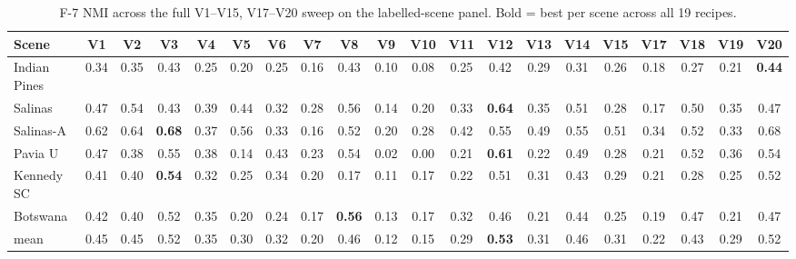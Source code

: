 \documentclass[journal,a4paper,10pt]{IEEEtran}
\begin{document}
\begin{table}[ht]
\caption{F-7 NMI across the full V1--V15, V17--V20 sweep on the
labelled-scene panel. Bold = best per scene across all 19 recipes.}
\label{tab:f7-full19}
\centering
\scriptsize
\setlength{\tabcolsep}{3pt}
\begin{tabular}{l*{19}{c}}
\toprule
Scene & V1 & V2 & V3 & V4 & V5 & V6 & V7 & V8 & V9 & V10 & V11 & V12 & V13 & V14 & V15 & V17 & V18 & V19 & V20 \\
\midrule
Indian Pines & 0.34 & 0.35 & 0.43 & 0.25 & 0.20 & 0.25 & 0.16 & 0.43 & 0.10 & 0.08 & 0.25 & 0.42 & 0.29 & 0.31 & 0.26 & 0.18 & 0.27 & 0.21 & \textbf{0.44} \\
Salinas      & 0.47 & 0.54 & 0.43 & 0.39 & 0.44 & 0.32 & 0.28 & 0.56 & 0.14 & 0.20 & 0.33 & \textbf{0.64} & 0.35 & 0.51 & 0.28 & 0.17 & 0.50 & 0.35 & 0.47 \\
Salinas-A    & 0.62 & 0.64 & \textbf{0.68} & 0.37 & 0.56 & 0.33 & 0.16 & 0.52 & 0.20 & 0.28 & 0.42 & 0.55 & 0.49 & 0.55 & 0.51 & 0.34 & 0.52 & 0.33 & 0.68 \\
Pavia U      & 0.47 & 0.38 & 0.55 & 0.38 & 0.14 & 0.43 & 0.23 & 0.54 & 0.02 & 0.00 & 0.21 & \textbf{0.61} & 0.22 & 0.49 & 0.28 & 0.21 & 0.52 & 0.36 & 0.54 \\
Kennedy SC   & 0.41 & 0.40 & \textbf{0.54} & 0.32 & 0.25 & 0.34 & 0.20 & 0.17 & 0.11 & 0.17 & 0.22 & 0.51 & 0.31 & 0.43 & 0.29 & 0.21 & 0.28 & 0.25 & 0.52 \\
Botswana     & 0.42 & 0.40 & 0.52 & 0.35 & 0.20 & 0.24 & 0.17 & \textbf{0.56} & 0.13 & 0.17 & 0.32 & 0.46 & 0.21 & 0.44 & 0.25 & 0.19 & 0.47 & 0.21 & 0.47 \\
\midrule
mean         & 0.45 & 0.45 & 0.52 & 0.35 & 0.30 & 0.32 & 0.20 & 0.46 & 0.12 & 0.15 & 0.29 & \textbf{0.53} & 0.31 & 0.46 & 0.31 & 0.22 & 0.43 & 0.29 & 0.52 \\
\bottomrule
\end{tabular}
\end{table}



\end{document}
